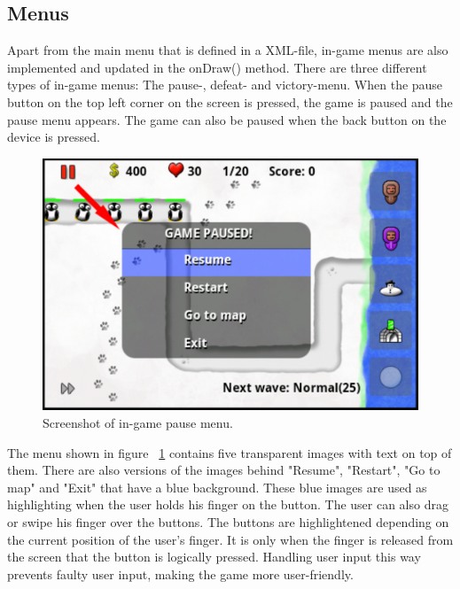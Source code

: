 \subsection{Menus}

Apart from the main menu that is defined in a XML-file, in-game menus are also implemented and updated in the onDraw() method. There are three different types of in-game menus: The pause-, defeat- and victory-menu. When the pause button on the top left corner on the screen is pressed, the game is paused and the pause menu appears. The game can also be paused when the back button on the device is pressed.

\clearpage

\begin{figure}[here]
\begin{center}
\includegraphics[scale=0.6]{pics/chapters/chapter4/in-gamePauseMenu}
\end{center}
\caption{Screenshot of in-game pause menu.}
\label{fig:ingamePauseMenu}
\end{figure}

The menu shown in figure ~\ref{fig:ingamePauseMenu} contains five transparent images with text on top of them. There are also versions of the images behind "Resume", "Restart", "Go to map" and "Exit" that have a blue background. These blue images are used as highlighting when the user holds his finger on the button. The user can also drag or swipe his finger over the buttons. The buttons are highlightened depending on the current position of the user's finger. It is only when the finger is released from the screen that the button is logically pressed. Handling user input this way prevents faulty user input, making the game more user-friendly.


